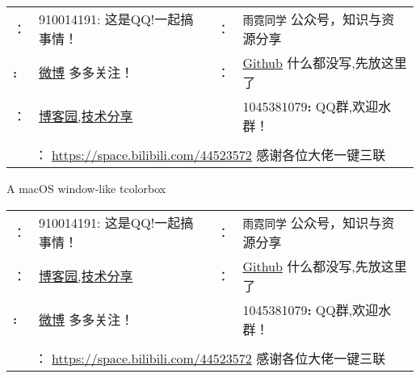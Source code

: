 \documentclass{article}
\begin{document}
\begin{sBox}
\begin{center}
	\noindent\footnotesize\begin{tabular}{@{}l@{ }l|l@{ }l@{}}
		\textcolor[RGB]{18,183,245}{\faQq}：&910014191:  这是QQ!一起搞事情！\faSendO   & \textcolor[RGB]{9,187,7}{\faWeixin}：&\verb|雨霓同学|  公众号，知识与资源分享\faSendO \\
		\textcolor[RGB]{236, 29, 152}{\faWeibo}\textbf{:} & \href{https://weibo.com/u/5713129191}{微博} \faSendO 多多关注！
		 &
		 {\textcolor[RGB]{39,165,188}{\faGithubAlt}}：& \href{https://github.com/Azure1210/}{Github}  什么都没写,先放这里了 \\
		\textcolor[RGB]{0,194,255}{\faInternetExplorer}：& \href{https://www.cnblogs.com/1210x1184/}{ 博客园,技术分享} 
		 &\textcolor[RGB]{255, 148, 209}{\faUsers} &1045381079\textbf{:}  QQ群,欢迎水群！\faSendO \\[2pt]\\
		\multicolumn{4}{c}{\textcolor[RGB]{252,74,35}{\faTv}： \url{https://space.bilibili.com/44523572} \faSendO 感谢各位大佬一键三联\faSendO}\\
\end{tabular}
\end{center}	
\end{sBox}	
\begin{macbox}{A macOS window-like tcolorbox}
\begin{tabular}{@{}l@{ }l|l@{ }l@{}}
	\textcolor[RGB]{18,183,245}{\faQq}：&910014191:  这是QQ!一起搞事情！\faSendO   & \textcolor[RGB]{9,187,7}{\faWeixin}：&\verb|雨霓同学|  公众号，知识与资源分享\faSendO \\
	\textcolor[RGB]{0,194,255}{\faInternetExplorer}：& \href{https://www.cnblogs.com/1210x1184/}{ 博客园,技术分享}  & {\textcolor[RGB]{39,165,188}{\faGithubAlt}}：& \href{https://github.com/Azure1210/}{Github}  什么都没写,先放这里了 \\
	\textcolor[RGB]{236, 29, 152}{\faWeibo}\textbf{:} & \href{https://weibo.com/u/5713129191}{微博} \faSendO 多多关注！ &\textcolor[RGB]{255, 148, 209}{\faUsers} &1045381079\textbf{:}  QQ群,欢迎水群！\faSendO \\[2pt]\\
	\multicolumn{4}{c}{\textcolor[RGB]{252,74,35}{\faTv}： \url{https://space.bilibili.com/44523572} \faSendO 感谢各位大佬一键三联\faSendO}\\
\end{tabular}
\end{macbox}
\end{document}
